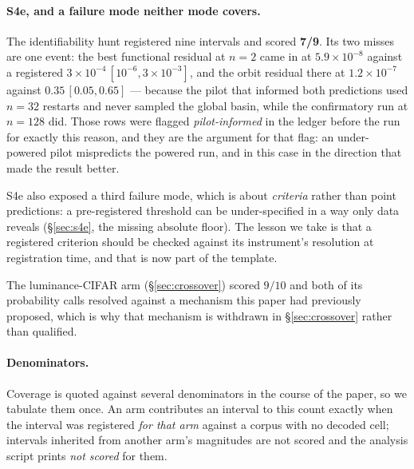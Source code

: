 \documentclass[10pt,letterpaper]{article}
\theoremstyle{definition}
\begin{document}
\paragraph{S4e, and a failure mode neither mode covers.} The identifiability hunt registered nine
intervals and scored \textbf{7/9}. Its two misses are one event: the best functional residual at
$n=2$ came in at $5.9\times10^{-8}$ against a registered $3\times10^{-4}\,[10^{-6}, 3\times10^{-3}]$,
and the orbit residual there at $1.2\times10^{-7}$ against $0.35\,[0.05, 0.65]$ --- because the
pilot that informed both predictions used $n=32$ restarts and never sampled the global basin, while
the confirmatory run at $n=128$ did. Those rows were flagged \emph{pilot-informed} in the ledger
before the run for exactly this reason, and they are the argument for that flag: an under-powered
pilot mispredicts the powered run, and in this case in the direction that made the result better.

S4e also exposed a third failure mode, which is about \emph{criteria} rather than point
predictions: a pre-registered threshold can be under-specified in a way only data reveals
(\S\ref{sec:s4e}, the missing absolute floor). The lesson we take is that a registered criterion
should be checked against its instrument's resolution at registration time, and that is now part of
the template.

The luminance-CIFAR arm (\S\ref{sec:crossover}) scored $9/10$ and both of its probability calls
resolved against a mechanism this paper had previously proposed, which is why that mechanism is
withdrawn in \S\ref{sec:crossover} rather than qualified.

\paragraph{Denominators.} Coverage is quoted against several denominators in the course of the
paper, so we tabulate them once. An arm contributes an interval to this count exactly when the
interval was registered \emph{for that arm} against a corpus with no decoded cell; intervals
inherited from another arm's magnitudes are not scored and the analysis script prints
\emph{not scored} for them.
\end{document}
